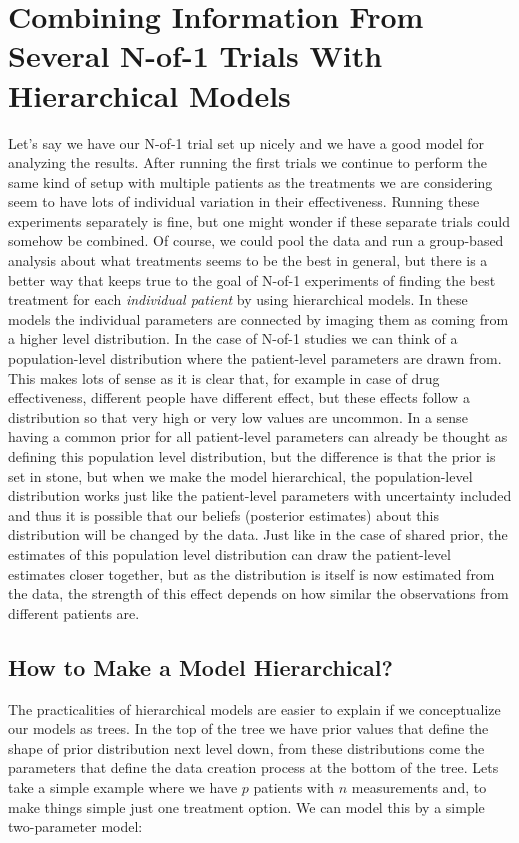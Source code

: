 \documentclass[12pt,a4paper,leqno]{report}
\theoremstyle{plain}
\theoremstyle{definition}
\theoremstyle{remark}
\begin{document}
\chapter{Combining Information From Several N-of-1 Trials With Hierarchical
  Models}\label{hierarchicalbayes}

Let's say we have our N-of-1 trial set up nicely and we have a good model for analyzing the
results. After running the first trials we continue to perform the same kind of setup
with multiple patients as the treatments we are considering seem to have lots of
individual variation in their effectiveness. Running these experiments separately is
fine, but one might wonder if these separate trials could somehow be combined. Of
course, we could pool the data and run a group-based
analysis about what treatments seems to be the best in general, but there is a better
way that keeps true to the goal of N-of-1 experiments of finding the best treatment for
each \emph{individual patient} by using hierarchical models. In these models the
individual parameters are connected by imaging them as coming from a higher level
distribution. In the case of N-of-1 studies we can think of a population-level distribution
where the patient-level parameters are drawn from. This makes lots of sense as it is
clear that, for example in case of drug effectiveness, different people have different
effect, but these effects follow a distribution so that very high or very low values are
uncommon. In a sense having a common prior for
all patient-level parameters can already be thought as defining this population level
distribution, but the difference is that the prior
is set in stone, but when we make the model hierarchical, the population-level
distribution works just like the patient-level
parameters with uncertainty included and thus it is possible that our beliefs (posterior
estimates) about this distribution will be changed by the data. Just like in the case of
shared prior, the estimates of this population level distribution can draw the
patient-level estimates closer together, but as the distribution is itself is now
estimated from the data, the strength of this effect depends on how similar the
observations from different patients are.

\section{How to Make a Model Hierarchical?}

The practicalities of hierarchical models are easier to explain if we conceptualize our
models as trees. In the top of the tree we have prior values that define the shape of
prior distribution next level down, from these distributions come the parameters that
define the data creation process at the bottom of the tree. Lets take a simple example
where we have \(p\) patients with \(n\)
measurements and, to make things simple just one treatment option. We can model this by
a simple two-parameter model:
\end{document}
